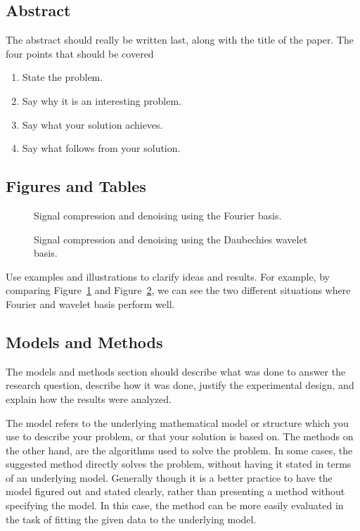 \documentclass[10pt,conference,compsocconf]{IEEEtran}
\begin{document}
\subsection{Abstract}
The abstract should really be written last, along with the title of
the paper. The four points that should be covered~
\begin{enumerate}
\item State the problem.
\item Say why it is an interesting problem.
\item Say what your solution achieves.
\item Say what follows from your solution.
\end{enumerate}

\subsection{Figures and Tables}

\begin{figure}[tbp]
  \centering
  \caption{Signal compression and denoising using the Fourier basis.}
  \vspace{-3mm}
  \label{fig:denoise-fourier}
\end{figure}
\begin{figure}[htbp]
  \centering
  \vspace{-3mm}
  \caption{Signal compression and denoising using the Daubechies wavelet basis.}
  \label{fig:denoise-wavelet}
\end{figure}

Use examples and illustrations to clarify ideas and results. For
example, by comparing Figure~\ref{fig:denoise-fourier} and
Figure~\ref{fig:denoise-wavelet}, we can see the two different
situations where Fourier and wavelet basis perform well. 

\subsection{Models and Methods}
The models and methods
section should describe what was
done to answer the research question, describe how it was done,
justify the experimental design, and
explain how the results were analyzed.

The model refers to the underlying mathematical model or structure which 
you use to describe your problem, or that your solution is based on. 
The methods on the other hand, are the algorithms used to solve the problem. 
In some cases, the suggested method directly solves the problem, without having it 
stated in terms of an underlying model. Generally though it is a better practice to have 
the model figured out and stated clearly, rather than presenting a method without specifying 
the model. In this case, the method can be more easily evaluated in the task of fitting 
the given data to the underlying model.
\end{document}
